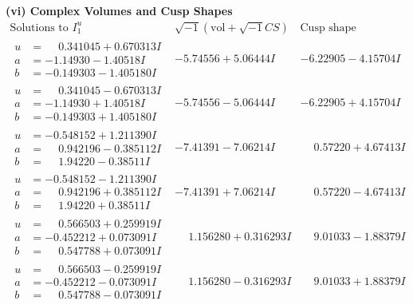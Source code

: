 \documentclass[1p]{elsarticle_modified}
\theoremstyle{definition}
\newcommand{\I}{\sqrt{-1}}
\begin{document}
\newpage\flushleft \textbf{(vi) Complex Volumes and Cusp Shapes}
$$\begin{array}{c|c|c}  
\text{Solutions to }I^u_{1}& \I (\text{vol} + \sqrt{-1}CS) & \text{Cusp shape}\\
 \hline 
\begin{aligned}
u &= \phantom{-}0.341045 + 0.670313 I \\
a &= -1.14930 - 1.40518 I \\
b &= -0.149303 - 1.405180 I\end{aligned}
 & -5.74556 + 5.06444 I & -6.22905 - 4.15704 I \\ \hline\begin{aligned}
u &= \phantom{-}0.341045 - 0.670313 I \\
a &= -1.14930 + 1.40518 I \\
b &= -0.149303 + 1.405180 I\end{aligned}
 & -5.74556 - 5.06444 I & -6.22905 + 4.15704 I \\ \hline\begin{aligned}
u &= -0.548152 + 1.211390 I \\
a &= \phantom{-}0.942196 - 0.385112 I \\
b &= \phantom{-}1.94220 - 0.38511 I\end{aligned}
 & -7.41391 - 7.06214 I & \phantom{-}0.57220 + 4.67413 I \\ \hline\begin{aligned}
u &= -0.548152 - 1.211390 I \\
a &= \phantom{-}0.942196 + 0.385112 I \\
b &= \phantom{-}1.94220 + 0.38511 I\end{aligned}
 & -7.41391 + 7.06214 I & \phantom{-}0.57220 - 4.67413 I \\ \hline\begin{aligned}
u &= \phantom{-}0.566503 + 0.259919 I \\
a &= -0.452212 + 0.073091 I \\
b &= \phantom{-}0.547788 + 0.073091 I\end{aligned}
 & \phantom{-}1.156280 + 0.316293 I & \phantom{-}9.01033 - 1.88379 I \\ \hline\begin{aligned}
u &= \phantom{-}0.566503 - 0.259919 I \\
a &= -0.452212 - 0.073091 I \\
b &= \phantom{-}0.547788 - 0.073091 I\end{aligned}
 & \phantom{-}1.156280 - 0.316293 I & \phantom{-}9.01033 + 1.88379 I \\ \hline\begin{aligned}

\end{aligned}
\end{array}$$
\end{document}
